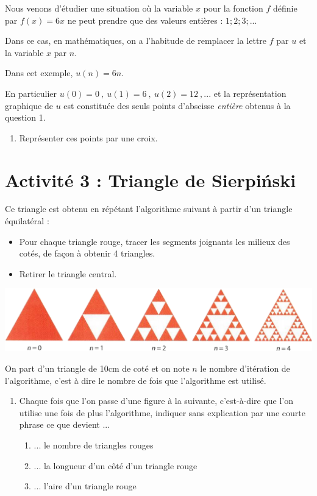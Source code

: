 Nous venons d'étudier une situation où la variable $x$ pour la fonction $f$ définie par $f(x)=6x$ ne peut prendre que des valeurs entières : $1 ; 2 ; 3; ...$

Dans ce cas, en mathématiques, on a l'habitude de remplacer la lettre $f$ par $u$ et la variable $x$ par $n$.

Dans cet exemple, $u(n)=6n$.

En particulier $u(0)=0~,~u(1)=6~,~u(2)=12~,...$ et la représentation graphique de $u$ est constituée des seuls points d'abscisse \textit{entière} obtenus à la question 1.

\begin{enumerate}[resume]
	\item Représenter ces points par une croix.
\end{enumerate}
\vspace*{0.7cm}
\section{Activité 3 : Triangle de Sierpiński}
Ce triangle est obtenu en répétant l'algorithme suivant à partir d'un triangle équilatéral :
\begin{itemize}[label=$\bullet$]
	\item Pour chaque triangle rouge, tracer les segments joignants les milieux des cotés, de façon à obtenir 4 triangles.
	\item Retirer le triangle central.
\end{itemize}
\begin{center}\includegraphics[width=18cm]{triangles.png}\end{center}
On part d'un triangle de 10cm de coté et on note $n$ le nombre d'itération de l'algorithme, c'est à dire le nombre de fois que l'algorithme est utilisé.

\begin{enumerate}
	\item Chaque fois que l'on passe d'une figure à la suivante, c'est-à-dire que l'on utilise une fois de plus l'algorithme, indiquer sans explication par une courte phrase ce que devient ...
	      \begin{enumerate}
		      \item ... le nombre de triangles rouges
		      \item ... la longueur d'un côté d'un triangle rouge
		      \item ... l'aire d'un triangle rouge
	      \end{enumerate}
\end{enumerate}

